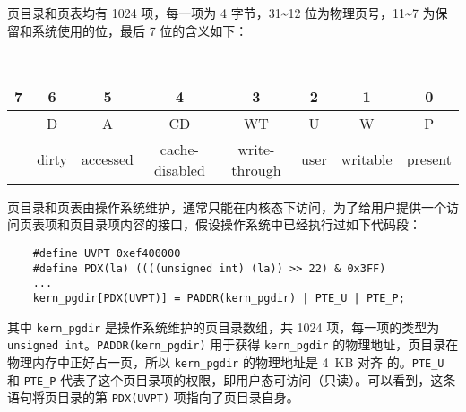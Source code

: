 \begin{problems}
        页目录和页表均有 1024 项，每一项为 4 字节，31\textasciitilde 12 位为物理页号，11\textasciitilde 7 为保留和系统使用的位，最后 7 位的含义如下：
        \begin{table}[H]
            \tt
            \centering
            \begin{tabular}{cccccccc}
                {\footnotesize 7} & {\footnotesize 6} & {\footnotesize 5} & {\footnotesize 4} & {\footnotesize 3} & {\footnotesize 2} & {\footnotesize 1} & {\footnotesize 0} \\ \hline
                \multicolumn{1}{|c|}{\cellcolor{gray!50}} & \multicolumn{1}{c|}{D} & \multicolumn{1}{c|}{A} & \multicolumn{1}{c|}{CD} & \multicolumn{1}{c|}{WT} & \multicolumn{1}{c|}{U} & \multicolumn{1}{c|}{W} & \multicolumn{1}{c|}{P} \\ \hline
                & {\footnotesize dirty} & {\footnotesize accessed} & {\footnotesize cache-disabled} & {\footnotesize write-through} & {\footnotesize user} & {\footnotesize writable} & {\footnotesize present}
            \end{tabular}
        \end{table}

        页目录和页表由操作系统维护，通常只能在内核态下访问，为了给用户提供一个访问页表项和页目录项内容的接口，假设操作系统中已经执行过如下代码段：
        \begin{verbatim}
    #define UVPT 0xef400000
    #define PDX(la) ((((unsigned int) (la)) >> 22) & 0x3FF)
    ...
    kern_pgdir[PDX(UVPT)] = PADDR(kern_pgdir) | PTE_U | PTE_P;
        \end{verbatim}
        其中 \verb|kern_pgdir| 是操作系统维护的页目录数组，共 1024 项，每一项的类型为 \verb|unsigned int|。\verb|PADDR(kern_pgdir)| 用于获得 \verb|kern_pgdir| 的物理地址，页目录在物理内存中正好占一页，所以 \verb|kern_pgdir| 的物理地址是 \SI{4}{KB} 对齐 的。\verb|PTE_U| 和 \verb|PTE_P| 代表了这个页目录项的权限，即用户态可访问（只读）。可以看到，这条语句将页目录的第 \verb|PDX(UVPT)| 项指向了页目录自身。
        

\end{problems}
